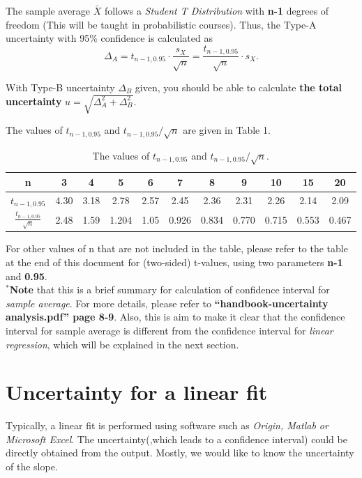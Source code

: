 \documentclass[12pt]{article}
\begin{document}
\par The sample average $\bar{X}$ follows a \textit{Student T Distribution} with \textbf{n-1} degrees of freedom (This will be taught in probabilistic courses). Thus, the Type-A uncertainty with 95\% confidence is calculated as
\begin{equation}
\Delta_A=t_{n-1,0.95}\cdot \frac{s_X}{\sqrt{n}}=\frac{t_{n-1,0.95}}{\sqrt{n}}\cdot s_X.
\end{equation}

With Type-B uncertainty $\Delta_B$ given, you should be able to calculate \textbf{the total uncertainty} $u=\sqrt{\Delta_A^2+\Delta_B^2}$.

\vspace{0.3em}
The values of $t_{n-1,0.95}$ and $t_{n-1,0.95}/\sqrt{n}$ are given in Table 1.

\begin{table}[H]
\centering
\begin{tabular}{c|cccccccccc}
\hline
n &3 &4 &5 &6 &7 &8 &9 &10 &15 &20\\\hline\hline
$t_{n-1,0.95}$ &4.30 &3.18 &2.78 &2.57 &2.45 &2.36 &2.31 &2.26 &2.14 &2.09 \\
$\frac{t_{n-1,0.95}}{\sqrt{n}}$ &2.48 &1.59 &1.204 &1.05 &0.926 &0.834 &0.770 &0.715 &0.553 &0.467\\\hline
\end{tabular}
\caption{The values of $t_{n-1,0.95}$ and $t_{n-1,0.95}/\sqrt{n}$.}
\end{table}


For other values of n that are not included in the table, please refer to the table at the end of this document for (two-sided) t-values, using two parameters \textbf{n-1} and \textbf{0.95}.
\\

$^*$\textbf{Note} that this is a brief summary for calculation of confidence interval for \textit{sample average}. For more details, please refer to \textbf{``handbook-uncertainty analysis.pdf'' page 8-9}. Also, this is aim to make it clear that the confidence interval for sample average is different from the confidence interval for \textit{linear regression}, which will be explained in the next section.

\section{Uncertainty for a linear fit}

Typically, a linear fit is performed using software such as \textit{Origin, Matlab or Microsoft Excel}. The uncertainty(,which leads to a confidence interval) could be directly obtained from the output. Mostly, we would like to know the uncertainty of the slope.
\end{document}
